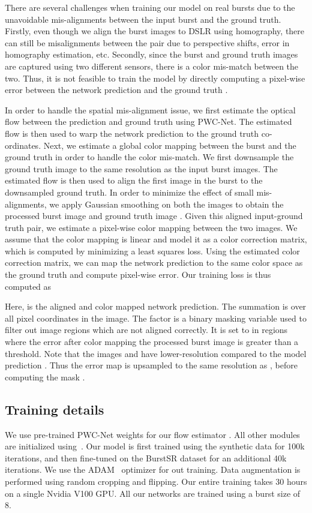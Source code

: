  There are several challenges when training our model on real bursts due to the unavoidable mis-alignments between the input burst and the ground truth. Firstly, even though we align the burst images to DSLR using homography, there can still be misalignments between the pair due to perspective shifts, error in homography estimation, etc. Secondly, since the burst and ground truth images are captured using two different sensors, there is a color mis-match between the two. Thus, it is not feasible to train the model by directly computing a pixel-wise error between the network prediction  and the ground truth . 

In order to handle the spatial mis-alignment issue, we first estimate the optical flow  between the prediction and ground truth using PWC-Net. The estimated flow is then used to warp the network prediction to the ground truth co-ordinates. Next, we estimate a global color mapping between the burst and the ground truth in order to handle the color mis-match. We first downsample the ground truth image to the same resolution as the input burst images. The estimated flow  is then used to align the first image in the burst to the downsampled ground truth. In order to minimize the effect of small mis-alignments, we apply Gaussian smoothing on both the images to obtain the processed burst image  and ground truth image . Given this aligned input-ground truth pair, we estimate a pixel-wise color mapping  between the two images. We assume that the color mapping is linear and model it as a  color correction matrix, which is computed by minimizing a least squares loss. Using the estimated color correction matrix, we can map the network prediction to the same color space as the ground truth and compute pixel-wise error.
Our training loss  is thus computed as

Here,  is the aligned and color mapped network prediction. The summation is over all pixel coordinates  in the image. The factor  is a binary masking variable used to filter out image regions which are not aligned correctly. It is set to  in regions where the error  after color mapping the processed burst image  is greater than a threshold. Note that the images  and  have lower-resolution compared to the model prediction . Thus the error map  is upsampled to the same resolution as , before computing the mask .

\subsection{Training details}
We use pre-trained PWC-Net weights for our flow estimator . All other modules are initialized using~\cite{He2015DelvingDI}. Our model is first trained using the synthetic data for 100k iterations, and then fine-tuned on the BurstSR dataset for an additional 40k iterations. We use the ADAM~\cite{Kingma2015AdamAM} optimizer for out training. Data augmentation is performed using random cropping and flipping. Our entire training takes 30 hours on a single Nvidia V100 GPU. All our networks are trained using a burst size of 8.
